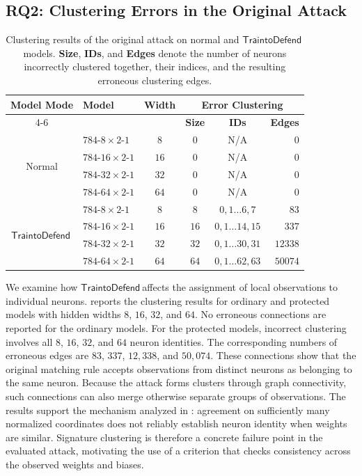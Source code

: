 \documentclass[runningheads]{llncs}
\newcommand{\td}{$\mathsf{Train to Defend}~$}
\begin{document}
\subsection{RQ2: Clustering Errors in the Original Attack}\label{sec:experiments:rq2}
\begin{table}[t]
\centering
\caption{Clustering results of the original attack on normal and \td models. \textbf{Size}, \textbf{IDs}, and \textbf{Edges} denote the number of neurons incorrectly clustered together, their indices, and the resulting erroneous clustering edges.}
\label{tab:original_clustering}
\setlength{\tabcolsep}{3pt}
\renewcommand{\arraystretch}{1.05}
\begin{tabular}{clcccr}
\toprule
\multirow{2}{*}{\textbf{Model Mode}}
& \multirow{2}{*}{\textbf{Model}}
& \multirow{2}{*}{\textbf{Width}}
& \multicolumn{3}{c}{\textbf{Error Clustering}} \\
\cmidrule(lr){4-6}
& & & \textbf{Size} & \textbf{IDs} & \textbf{Edges} \\
\midrule
\multirow{4}{*}{Normal}
& ${784\text{-}8\times2\text{-}1}$
& $8$& $0$& N/A& $0$ \\
&${784\text{-}16\times2\text{-}1}$& $16$& $0$& N/A& $0$ \\
& ${784\text{-}32\times2\text{-}1}$& $32$& $0$& N/A& $0$ \\& ${784\text{-}64\times2\text{-}1}$& $64$& $0$& N/A& $0$ \\
\midrule
\multirow{4}{*}{\td}& ${784\text{-}8\times2\text{-}1}$& $8$& $8$& $0,1\ldots 6,7$& $83$ \\
&${784\text{-}16\times2\text{-}1}$& $16$& $16$& $0,1\ldots 14,15$& $337$ \\
& ${784\text{-}32\times2\text{-}1}$& $32$& $32$& $0,1\ldots 30,31$& $12338$ \\
&${784\text{-}64\times2\text{-}1}$& $64$& $64$& $0,1\ldots62,63$& $50074$ \\
\bottomrule
\end{tabular}%
\end{table}

We examine how \td affects the assignment of local observations to individual neurons.
 reports the clustering results for ordinary and protected models with hidden widths $8$, $16$, $32$, and $64$.
No erroneous connections are reported for the ordinary models.
For the protected models, incorrect clustering involves all $8$, $16$, $32$, and $64$ neuron identities.
The corresponding numbers of erroneous edges are $83$, $337$, $12{,}338$, and $50{,}074$.
These connections show that the original matching rule accepts observations from distinct neurons as belonging to the same neuron.
Because the attack forms clusters through graph connectivity, such connections can also merge otherwise separate groups of observations.
The results support the mechanism analyzed in : agreement on sufficiently many normalized coordinates does not reliably establish neuron identity when weights are similar.
Signature clustering is therefore a concrete failure point in the evaluated attack, motivating the use of a criterion that checks consistency across the observed weights and biases.
\end{document}
